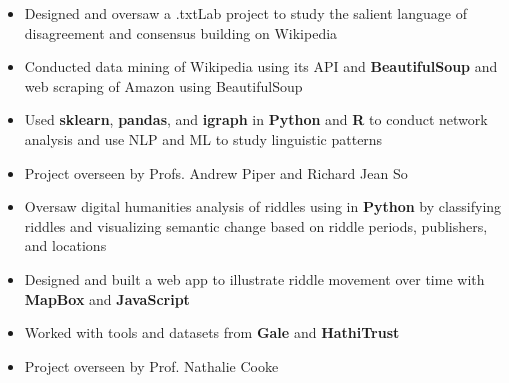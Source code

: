 \documentclass[10pt,ragged2e]{altacv}
\begin{document}
\tagline{}

\begin{fullwidth}
\makecvheader
\end{fullwidth}



\begin{itemize}
\item Designed and oversaw a .txtLab project to study the salient language of disagreement and consensus building on Wikipedia
\item Conducted data mining of Wikipedia using its API and \textbf{BeautifulSoup} and web scraping of Amazon using BeautifulSoup
\item Used \textbf{sklearn}, \textbf{pandas}, and \textbf{igraph} in \textbf{Python} and \textbf{R} to conduct network analysis and use NLP and ML to study linguistic patterns
\item Project overseen by Profs. Andrew Piper and Richard Jean So
\end{itemize}

\divider

\begin{itemize}
\item Oversaw digital humanities analysis of riddles using in \textbf{Python} by classifying riddles and visualizing semantic change based on riddle periods, publishers, and locations
\item Designed and built a web app to illustrate riddle movement over time with \textbf{MapBox} and \textbf{JavaScript}
\item Worked with tools and datasets from \textbf{Gale} and \textbf{HathiTrust}
\item Project overseen by Prof. Nathalie Cooke
\end{itemize}
\end{document}
